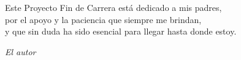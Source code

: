 
\cleardoublepage
\thispagestyle{empty} %

\begin{minipage}[c][\textheight][c]{\textwidth} %
\raggedleft %

Este Proyecto Fin de Carrera está dedicado a mis padres, \\
por el apoyo y la paciencia que siempre me brindan,\\
y que sin duda ha sido esencial para llegar hasta donde estoy.

\bigskip

\emph{El autor}

\end{minipage}

\blankpage
